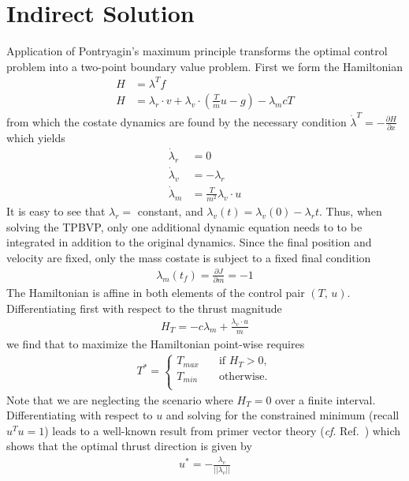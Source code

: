 \documentclass[10pt,a4paper]{article}
\begin{document}
\section{Indirect Solution}
Application of Pontryagin's maximum principle transforms the optimal control problem into a two-point boundary value problem. First we form the Hamiltonian
\begin{align}
H &= \lambda^Tf \\
H &= \lambda_r\cdot v + \lambda_v\cdot(\frac{T}{m}u - g) - \lambda_m c T
\end{align}
from which the costate dynamics are found by the necessary condition $\dot{\lambda}^T = -\frac{\partial H}{\partial x}$ which yields
\begin{align}
\dot{\lambda}_r &= 0 \\
\dot{\lambda}_v &= -\lambda_r \\
\dot{\lambda}_m &= \frac{T}{m^2}\lambda_v\cdot u
\end{align}
It is easy to see that $\lambda_r=$ constant, and $\lambda_v(t) = \lambda_v(0)-\lambda_rt$. Thus, when solving the TPBVP, only one additional dynamic equation needs to to be integrated in addition to the original dynamics. Since the final position and velocity are fixed, only the mass costate is subject to a fixed final condition
\begin{align}
\lambda_m(t_f) = \frac{\partial J}{\partial m} = -1
\end{align}
The Hamiltonian is affine in both elements of the control pair $(T,\,u)$. Differentiating first with respect to the thrust magnitude 
\begin{align}
H_T = -c\lambda_m + \frac{\lambda_v\cdot u}{m}
\end{align}
we find that to maximize the Hamiltonian point-wise requires
\begin{align}
T^* = 
     \begin{cases}
       T_{max} &\quad\text{if }H_T>0,\\
       T_{min} &\quad\text{otherwise.} \\ 
     \end{cases}
\end{align}
Note that we are neglecting the scenario where $ H_T=0 $ over a finite interval. Differentiating with respect to $u$ and solving for the constrained minimum (recall $u^Tu=1$) leads to a well-known result from primer vector theory (\textit{cf}. Ref.~\cite{primer,primer2}) which shows that the optimal thrust direction is given by
\begin{align}
u^* = -\frac{\lambda_v}{||\lambda_v||}
\end{align}
\end{document}
